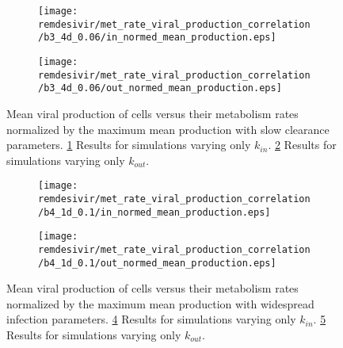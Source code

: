 \begin{figure}[H]
\begin{subfigure}{0.5\textwidth}
\texttt{[image: remdesivir/met\_rate\_viral\_production\_correlation/b3\_4d\_0.06/in\_normed\_mean\_production.eps]}
\caption{}\label{app:fig:res:treat:super:persistent:in}
\end{subfigure}
\vspace*{5pt}
\hspace*{\fill}

\begin{subfigure}{0.5\textwidth}
\texttt{[image: remdesivir/met\_rate\_viral\_production\_correlation/b3\_4d\_0.06/out\_normed\_mean\_production.eps]}
\caption{}\label{app:fig:res:treat:super:persistent:out}
\end{subfigure}
\caption{Mean viral production of cells versus their metabolism rates normalized by the maximum mean production with slow clearance parameters.
 \ref{app:fig:res:treat:super:persistent:in} Results for simulations varying only $k_{in}$. \ref{app:fig:res:treat:super:persistent:out} Results for simulations varying only $k_{out}$.}\label{app:fig:res:treat:super:persistent}
\end{figure}

\begin{figure}[H]
\begin{subfigure}{0.5\textwidth}
\texttt{[image: remdesivir/met\_rate\_viral\_production\_correlation/b4\_1d\_0.1/in\_normed\_mean\_production.eps]}
\caption{}\label{app:fig:res:treat:super:widespread:in}
\end{subfigure}
\vspace*{5pt}
\hspace*{\fill}

\begin{subfigure}{0.5\textwidth}
\texttt{[image: remdesivir/met\_rate\_viral\_production\_correlation/b4\_1d\_0.1/out\_normed\_mean\_production.eps]}
\caption{}\label{app:fig:res:treat:super:widespread:out}
\end{subfigure}
\caption{Mean viral production of cells versus their metabolism rates normalized by the maximum mean production with widespread infection parameters.
 \ref{app:fig:res:treat:super:widespread:in} Results for simulations varying only $k_{in}$. \ref{app:fig:res:treat:super:widespread:out} Results for simulations varying only $k_{out}$.}\label{app:fig:res:treat:super:widespread}
\end{figure}